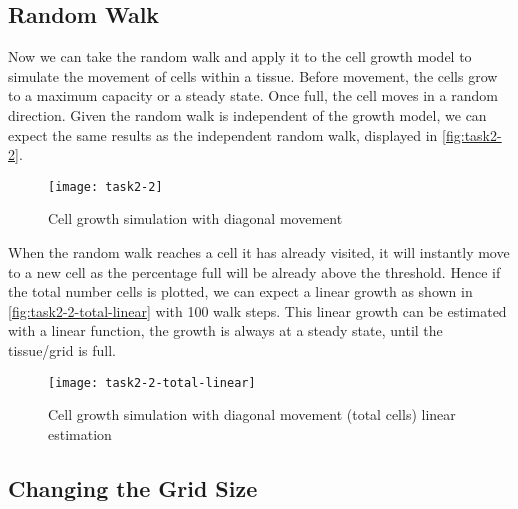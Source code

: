 \clearpage

\subsection{Random Walk}

Now we can take the random walk and apply it to the cell growth model to simulate the movement of cells within a tissue.
Before movement, the cells grow to a maximum capacity or a steady state. Once full, the cell moves in a random direction.
Given the random walk is independent of the growth model, we can expect the same results as the independent random walk, displayed in \autoref{fig:task2-2}.

\begin{figure}[ht]
    \centering
    \texttt{[image: task2-2]}
    \caption[Cell growth simulation with diagonal movement]{Cell growth simulation with diagonal movement}
    \label{fig:task2-2}
\end{figure}

When the random walk reaches a cell it has already visited, it will instantly move to a new cell as the percentage full will be already above the threshold.
Hence if the total number cells is plotted, we can expect a linear growth as shown in \autoref{fig:task2-2-total-linear} with 100 walk steps.
This linear growth can be estimated with a linear function, the growth is always at a steady state, until the tissue/grid is full.


\begin{figure}[ht]
    \centering
    \texttt{[image: task2-2-total-linear]}
    \caption[Cell growth simulation with diagonal movement (total cells) linear estimation]{Cell growth simulation with diagonal movement (total cells) linear estimation}
    \label{fig:task2-2-total-linear}
\end{figure}

\clearpage

\subsection{Changing the Grid Size}


